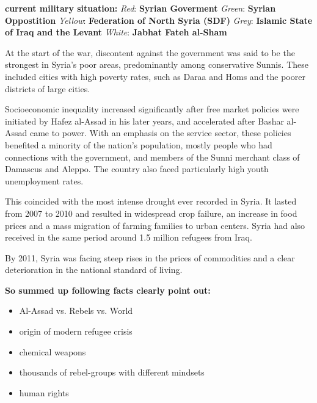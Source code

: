 \textbf{current military situation:}\newline
\textit{Red}: \textbf{Syrian Goverment}
\textit{Green}: \textbf{Syrian Oppostition}
\textit{Yellow}: \textbf{Federation of North Syria (SDF)}
\textit{Grey}: \textbf{Islamic State of Iraq and the Levant}
\textit{White}: \textbf{Jabhat Fateh al-Sham}

\newpage

At the start of the war, discontent against the government was said to be the strongest in Syria's poor areas, predominantly among conservative Sunnis. These included cities with high poverty rates, such as Daraa and Homs and the poorer districts of large cities.

Socioeconomic inequality increased significantly after free market policies were initiated by Hafez al-Assad in his later years, and accelerated after Bashar al-Assad came to power. With an emphasis on the service sector, these policies benefited a minority of the nation's population, mostly people who had connections with the government, and members of the Sunni merchant class of Damascus and Aleppo. The country also faced particularly high youth unemployment rates.

This coincided with the most intense drought ever recorded in Syria. It lasted from 2007 to 2010 and resulted in widespread crop failure, an increase in food prices and a mass migration of farming families to urban centers. Syria had also received in the same period around 1.5 million refugees from Iraq.

By 2011, Syria was facing steep rises in the prices of commodities and a clear deterioration in the national standard of living.

\textbf{So summed up following facts clearly point out:}
\begin{itemize}
	\item Al-Assad vs. Rebels vs. World
	\item origin of modern refugee crisis
	\item chemical weapons
	\item thousands of rebel-groups with different mindsets
	\item human rights
\end{itemize}



